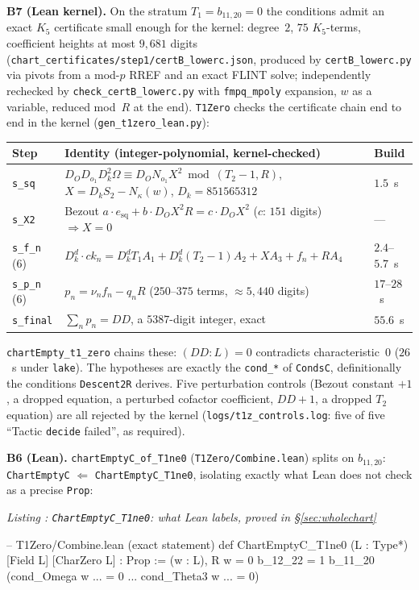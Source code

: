 \documentclass[a4paper,11pt]{article}
\newcounter{leanlisting}
\newenvironment{leanlisting}[2]{%
  \refstepcounter{leanlisting}\label{#2}%
  \begin{center}\textit{\small Listing \theleanlisting: #1}\end{center}%
  \Verbatim[breaklines=true,breakanywhere=true,fontsize=\footnotesize,frame=single,framesep=4pt,rulecolor=\color{gray!50},fillcolor=\color{gray!5}]%
}{%
  \endVerbatim%
}
\theoremstyle{plain}
\theoremstyle{definition}
\theoremstyle{remark}
\begin{document}
\textbf{B7 (Lean kernel).} On the stratum $T_1=b_{11,20}=0$ the conditions admit an exact $K_5$ certificate small enough for the kernel: degree~$2$, $75$ $K_5$-terms, coefficient heights at most $9{,}681$ digits (\texttt{chart\_certificates/step1/certB\_lowerc.json}, produced by \texttt{certB\_lowerc.py} via pivots from a mod-$p$ RREF and an exact FLINT solve; independently rechecked by \texttt{check\_certB\_lowerc.py} with \texttt{fmpq\_mpoly} expansion, $w$ as a variable, reduced mod~$R$ at the end). \texttt{T1Zero} checks the certificate chain end to end in the kernel (\texttt{gen\_t1zero\_lean.py}):
{\footnotesize
\begin{center}
\begin{tabular}{lll}
Step & Identity (integer-polynomial, kernel-checked) & Build \\ \midrule
\texttt{s\_sq} & $D_O D_{o_1} D_k^2\Omega\equiv D_O N_{o_1}X^2\bmod(T_2-1,R)$, $X=D_kS_2-N_\kappa(w)$, $D_k=851565312$ & $1.5$~s \\
\texttt{s\_X2} & Bezout $a\cdot e_{\mathrm{sq}}+b\cdot D_OX^2R=c\cdot D_OX^2$ ($c$: $151$ digits) $\Rightarrow X=0$ & --- \\
\texttt{s\_f\_n} (6) & $D_k^d\cdot ck_n=D_k^dT_1A_1+D_k^d(T_2-1)A_2+XA_3+f_n+RA_4$ & $2.4$--$5.7$~s \\
\texttt{s\_p\_n} (6) & $p_n=\nu_n f_n-q_nR$ ($250$--$375$ terms, $\approx5{,}440$ digits) & $17$--$28$~s \\
\texttt{s\_final} & $\sum_n p_n=DD$, a $5387$-digit integer, exact & $55.6$~s \\
\end{tabular}
\end{center}
}
\texttt{chartEmpty\_t1\_zero} chains these: $(DD:L)=0$ contradicts characteristic~$0$ ($26$~s under \texttt{lake}). The hypotheses are exactly the \texttt{cond\_*} of \texttt{CondsC}, definitionally the conditions \texttt{Descent2R} derives. Five perturbation controls (Bezout constant $+1$, a dropped equation, a perturbed cofactor coefficient, $DD+1$, a dropped $T_2$ equation) are all rejected by the kernel (\texttt{logs/t1z\_controls.log}: five of five ``Tactic \texttt{decide} failed'', as required).

\textbf{B6 (Lean).} \texttt{chartEmptyC\_of\_T1ne0} (\texttt{T1Zero/Combine.lean}) splits on $b_{11,20}$: \texttt{ChartEmptyC} $\Leftarrow$ \texttt{ChartEmptyC\_T1ne0}, isolating exactly what Lean does not check as a precise \texttt{Prop}:
\begin{leanlisting}{\texttt{ChartEmptyC\_T1ne0}: what Lean labels, proved in \S\ref{sec:wholechart}}{lst:chartempty}
-- T1Zero/Combine.lean (exact statement)
def ChartEmptyC_T1ne0 (L : Type*) [Field L] [CharZero L] : Prop :=
  \forall (w : L), R w = 0 \to b_12_22 = 1 \to b_11_20  \to
    \lnot (cond_Omega w ... = 0 \land ... \land cond_Theta3 w ... = 0)
\end{leanlisting}
\end{document}
